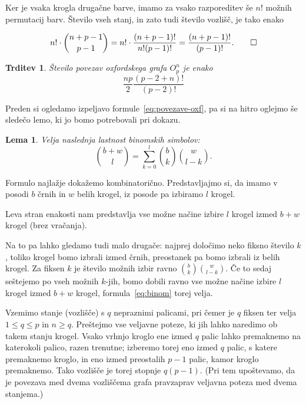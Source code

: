 \documentclass[12pt,a4paper]{amsart}
\theoremstyle{definition} %
\theoremstyle{plain} %
\newtheorem{lema}[definicija]{Lema}
\newtheorem{trditev}[definicija]{Trditev}
\begin{document}
    Ker je vsaka krogla drugačne barve, imamo za vsako razporeditev še $n!$ možnih permutacij barv. Število vseh stanj, in zato tudi število vozlišč, je tako enako
    
    \[ n! \cdot {n+p-1 \choose p-1} = n! \cdot \frac{(n+p-1)!}{n!(p-1)!} = \frac{(n+p-1)!}{(p-1)!}. \qedhere\] 
\endproof

\begin{trditev}
    Število povezav oxfordskega grafa $O^n_p$ je enako
    \begin{equation}
        \label{eq:povezave-oxf}
        \frac{np}{2} \frac{(p-2+n)!}{(p-2)!}
    \end{equation}
    \label{trd:povezave-oxf}
\end{trditev}

Preden si ogledamo izpeljavo formule~\eqref{eq:povezave-oxf}, pa si na hitro oglejmo še sledečo lemo, ki jo bomo potrebovali pri dokazu.

\begin{lema}
    Velja naslednja lastnost binomskih simbolov:
    \begin{equation}
        \label{eq:binom}
        {b+w \choose l} = \sum_{k=0}^{l}{b \choose k}{w \choose l-k}.
    \end{equation}
\end{lema}

\proof
    Formulo najlažje dokažemo kombinatorično. Predstavljajmo si, da imamo v posodi $b$ črnih in $w$ belih krogel, iz posode pa izbiramo $l$ krogel.
    
    Leva stran enakosti nam predstavlja vse možne načine izbire $l$ krogel izmed $b+w$ krogel (brez vračanja). 
    
    Na to pa lahko gledamo tudi malo drugače: najprej določimo neko fiksno število $k$, toliko krogel bomo izbrali izmed črnih, preostanek pa bomo izbrali iz belih krogel. Za fiksen $k$ je število možnih izbir ravno ${b \choose k}{w \choose l-k}$. Če to sedaj seštejemo po vseh možnih $k$-jih, bomo dobili ravno vse možne načine izbire $l$ krogel izmed $b+w$ krogel, formula~\eqref{eq:binom} torej velja.
\endproof

    Vzemimo stanje (vozlišče) s $q$ nepraznimi palicami, pri čemer je $q$ fiksen ter velja $1 \leq q \leq p$ in $n \geq q$. Preštejmo vse veljavne poteze, ki jih lahko naredimo ob takem stanju krogel. Vsako vrhnjo kroglo ene izmed $q$ palic lahko premaknemo na katerokoli palico, razen trenutne; izberemo torej eno izmed $q$ palic, s katere premaknemo kroglo, in eno izmed preostalih $p-1$ palic, kamor kroglo premaknemo. Tako vozlišče je torej stopnje $q(p-1)$. (Pri tem upoštevamo, da je povezava med dvema vozliščema grafa pravzaprav veljavna poteza med dvema stanjema.)
    
\end{document}

